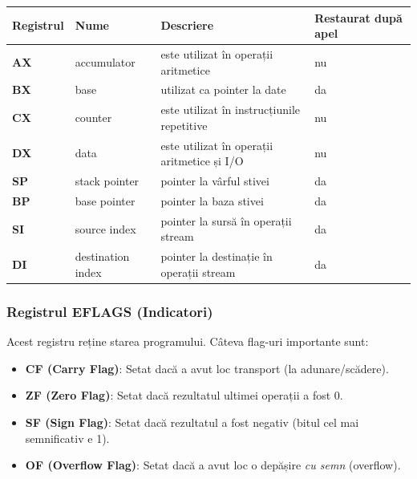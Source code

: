 \documentclass[12pt,a4paper]{article}
\begin{document}
\begin{table}[ht!]
\centering
\begin{tabular}{llll}
\toprule
\textbf{Registrul} & \textbf{Nume} & \textbf{Descriere} & \textbf{Restaurat după apel} \\
\midrule
\textbf{AX} & accumulator & este utilizat în operații aritmetice & nu \\
\textbf{BX} & base & utilizat ca pointer la date & da \\
\textbf{CX} & counter & este utilizat în instrucțiunile repetitive & nu \\
\textbf{DX} & data & este utilizat în operații aritmetice și I/O & nu \\
\textbf{SP} & stack pointer & pointer la vârful stivei & da \\
\textbf{BP} & base pointer & pointer la baza stivei & da \\
\textbf{SI} & source index & pointer la sursă în operații stream & da \\
\textbf{DI} & destination index & pointer la destinație în operații stream & da \\
\bottomrule
\end{tabular}
\label{tab:registri}
\end{table}

\subsubsection{Registrul EFLAGS (Indicatori)}
Acest registru reține starea programului. Câteva flag-uri importante sunt:
\begin{itemize}
    \item \textbf{CF (Carry Flag)}: Setat dacă a avut loc transport (la adunare/scădere).
    \item \textbf{ZF (Zero Flag)}: Setat dacă rezultatul ultimei operații a fost 0.
    \item \textbf{SF (Sign Flag)}: Setat dacă rezultatul a fost negativ (bitul cel mai semnificativ e 1).
    \item \textbf{OF (Overflow Flag)}: Setat dacă a avut loc o depășire \textit{cu semn} (overflow).
\end{itemize}
\end{document}
